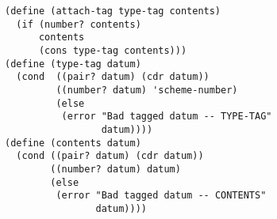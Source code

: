 \documentclass[a4paper,12pt]{article}
\begin{document}
\begin{lstlisting}
(define (attach-tag type-tag contents)
  (if (number? contents)
      contents
      (cons type-tag contents)))
(define (type-tag datum)
  (cond  ((pair? datum) (cdr datum))
         ((number? datum) 'scheme-number)
         (else
          (error "Bad tagged datum -- TYPE-TAG"
                 datum))))
(define (contents datum)
  (cond ((pair? datum) (cdr datum))
        ((number? datum) datum)
        (else
         (error "Bad tagged datum -- CONTENTS"
                datum))))
\end{lstlisting}
\end{document}
